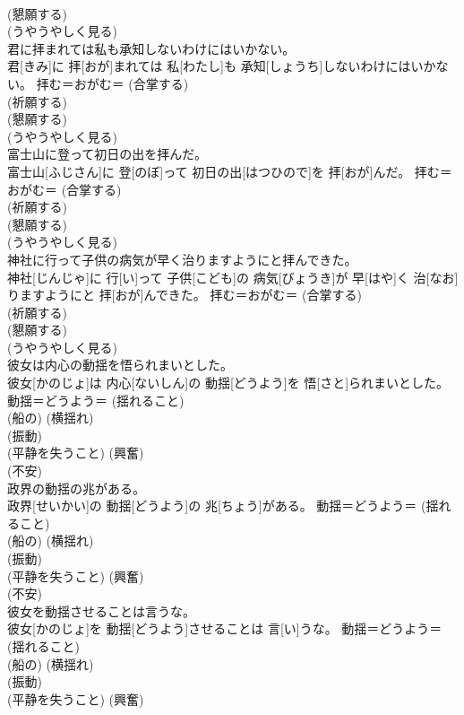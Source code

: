 \documentclass[8pt]{extreport}
\begin{document}
\begin{CJK}{UTF8}{min}
{\\	(懇願する) 
\\	(うやうやしく見る) 
\\	君に拝まれては私も承知しないわけにはいかない。	
\\	君[きみ]に 拝[おが]まれては 私[わたし]も 承知[しょうち]しないわけにはいかない。	拝む＝おがむ＝ (合掌する) 
\\	(祈願する) 
\\	(懇願する) 
\\	(うやうやしく見る) 
\\	富士山に登って初日の出を拝んだ。	
\\	富士山[ふじさん]に 登[のぼ]って 初日の出[はつひので]を 拝[おが]んだ。	拝む＝おがむ＝ (合掌する) 
\\	(祈願する) 
\\	(懇願する) 
\\	(うやうやしく見る) 
\\	神社に行って子供の病気が早く治りますようにと拝んできた。	
\\	神社[じんじゃ]に 行[い]って 子供[こども]の 病気[びょうき]が 早[はや]く 治[なお]りますようにと 拝[おが]んできた。	拝む＝おがむ＝ (合掌する) 
\\	(祈願する) 
\\	(懇願する) 
\\	(うやうやしく見る) 
\\	彼女は内心の動揺を悟られまいとした。	
\\	彼女[かのじょ]は 内心[ないしん]の 動揺[どうよう]を 悟[さと]られまいとした。	動揺＝どうよう＝ (揺れること) 
\\	(船の) (横揺れ) 
\\	(振動) 
\\	(平静を失うこと) (興奮) 
\\	(不安) 
\\	政界の動揺の兆がある。	
\\	政界[せいかい]の 動揺[どうよう]の 兆[ちょう]がある。	動揺＝どうよう＝ (揺れること) 
\\	(船の) (横揺れ) 
\\	(振動) 
\\	(平静を失うこと) (興奮) 
\\	(不安) 
\\	彼女を動揺させることは言うな。	
\\	彼女[かのじょ]を 動揺[どうよう]させることは 言[い]うな。	動揺＝どうよう＝ (揺れること) 
\\	(船の) (横揺れ) 
\\	(振動) 
\\	(平静を失うこと) (興奮) 
}
\end{CJK}
\end{document}
